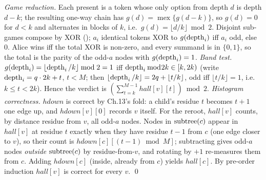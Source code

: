 \begin{proofbox}
\emph{Game reduction.} Each present is a token whose only option from depth $d$ is
depth $d-k$; the resulting one-way chain has $g(d)=\operatorname{mex}\{g(d-k)\}$, so
$g(d)=0$ for $d<k$ and alternates in blocks of $k$, i.e.\ $g(d)=\lfloor d/k\rfloor
\bmod 2$. Disjoint sub-games compose by XOR (); $a_i$ identical
tokens XOR to $g(\operatorname{depth}_i)$ iff $a_i$ odd, else $0$. Alice wins iff the total XOR is
non-zero, and every summand is in $\{0,1\}$, so the total is the parity of the odd-$a$
nodes with $g(\operatorname{depth}_i)=1$. \emph{Band test.} $g(\operatorname{depth}_i)=\lfloor\operatorname{depth}_i/k\rfloor
\bmod 2 = 1$ iff $\operatorname{depth}_i \bmod 2k \in [k,2k)$ (write $\operatorname{depth}_i = q\cdot 2k + t$,
$t<M$; then $\lfloor\operatorname{depth}_i/k\rfloor = 2q + \lfloor t/k\rfloor$, odd iff $\lfloor t/k
\rfloor = 1$, i.e.\ $k \le t < 2k$). Hence the verdict is
$(\sum_{t=k}^{M-1}\mathit{hall}[v][t]) \bmod 2$. \emph{Histogram correctness.}
$\mathit{hdown}$ is correct by Ch.13's fold: a child's residue $t$ becomes $t{+}1$
one edge up, and $\mathit{hdown}[v][0]$ records $v$ itself. For the reroot,
$\mathit{hall}[v]$ counts, by distance residue from $v$, all odd-$a$ nodes. Nodes in
$\operatorname{subtree}(c)$ appear in $\mathit{hall}[v]$ at residue $t$ exactly when they have
residue $t{-}1$ from $c$ (one edge closer to $v$), so their count is
$\mathit{hdown}[c][(t{-}1)\bmod M]$; subtracting gives odd-$a$ nodes \emph{outside}
$\operatorname{subtree}(c)$ by residue-from-$v$, and rotating by $+1$ re-measures them from $c$.
Adding $\mathit{hdown}[c]$ (inside, already from $c$) yields $\mathit{hall}[c]$. By
pre-order induction $\mathit{hall}[v]$ is correct for every $v$. \qed
\end{proofbox}

